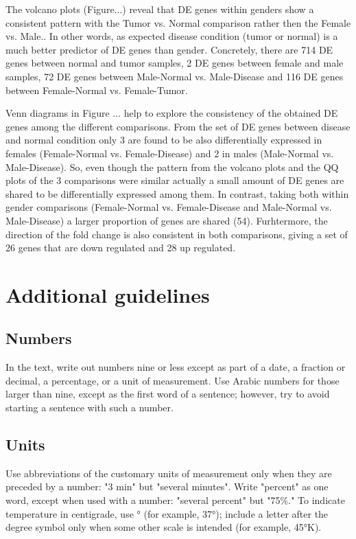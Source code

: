 \documentclass[9pt,twocolumn,twoside]{gsajnl}
\begin{document}
The volcano plots (Figure...) reveal that DE genes within genders show a consistent pattern with the Tumor vs. Normal comparison rather then the Female vs. Male.. In other words, as expected disease condition (tumor or normal) is a much better predictor of DE genes than gender. Concretely, there are 714 DE genes between normal and tumor samples, 2 DE genes between female and male samples, 72 DE genes between Male-Normal vs. Male-Disease and 116 DE genes between Female-Normal vs. Female-Tumor.

Venn diagrams in Figure ... help to explore the consistency of the obtained DE genes among the different comparisons. From the set of DE genes between disease and normal condition only 3 are found to be also differentially expressed in females (Female-Normal vs. Female-Disease) and 2 in males (Male-Normal vs. Male-Disease). So, even though the pattern from the volcano plots and the QQ plots of the 3 comparisons were similar actually a small amount of DE genes are shared to be differentially expressed among them. In contrast, taking both within gender comparisons (Female-Normal vs. Female-Disease and Male-Normal vs. Male-Disease) a larger proportion of genes are shared (54). Furhtermore, the direction of the fold change is also consistent in both comparisons, giving a set of 26 genes that are down regulated and 28 up regulated.





  




\section*{Additional guidelines}

\subsection*{Numbers} In the text, write out numbers nine or less except as part of a date, a fraction or decimal, a percentage, or a unit of measurement. Use Arabic numbers for those larger than nine, except as the first word of a sentence; however, try to avoid starting a sentence with such a number.

\subsection*{Units} Use abbreviations of the customary units of measurement only when they are preceded by a number: "3 min" but "several minutes". Write "percent" as one word, except when used with a number: "several percent" but "75\%." To indicate temperature in centigrade, use ° (for example, 37°); include a letter after the degree symbol only when some other scale is intended (for example, 45°K).
\end{document}
